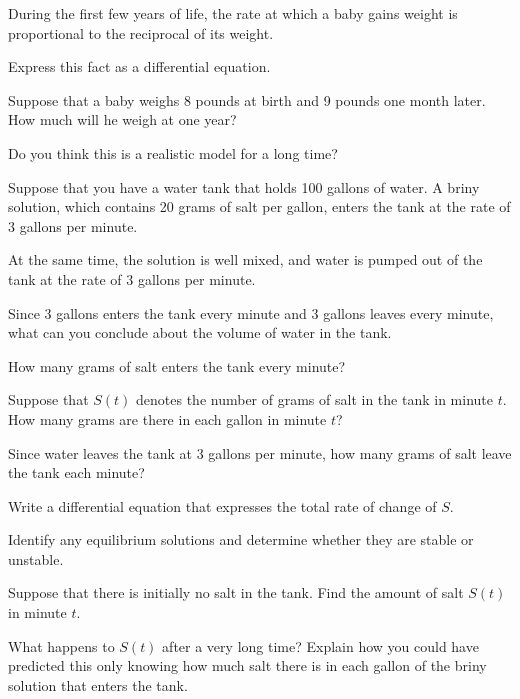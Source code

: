 \begin{exercises}
    \item During the first few years of life, the rate at which a baby
      gains weight is proportional to the reciprocal of its weight.

      \ba
      \item Express this fact as a differential equation.

      \item Suppose that a baby weighs 8 pounds at birth and 9 pounds
        one month later.  How much will he weigh at one year?
      \item Do you think this is a realistic model for a long time?
        \ea

\item  Suppose that you have a water tank that holds 100 gallons of water.
  A briny solution, which contains 20 grams of salt per gallon, enters
  the tank at the rate of 3 gallons per minute.

  At the same time, the solution is well mixed, and water is pumped
  out of the tank at the rate of 3 gallons per minute.

\ba
\item Since 3 gallons enters the tank every minute and 3 gallons
  leaves every minute, what can you conclude about the volume of water
  in the tank.

\item How many grams of salt enters the tank every minute?

\item Suppose that $S(t)$ denotes the number of grams of salt in the
  tank in minute $t$.  How many grams are there in each gallon in
  minute $t$?

\item Since water leaves the tank at 3 gallons per minute, how many
  grams of salt leave the tank each minute? 

\item Write a differential equation that expresses the total rate of
  change of $S$.

\item Identify any equilibrium solutions and determine whether they
  are stable or unstable.

\item Suppose that there is initially no salt in the tank.  Find the
  amount of salt $S(t)$ in minute $t$.

\item What happens to $S(t)$ after a very long time?  Explain how you
  could have predicted this only knowing how much salt there is in
  each gallon of the
  briny solution that enters the tank.
\ea

\end{exercises}
\afterexercises


